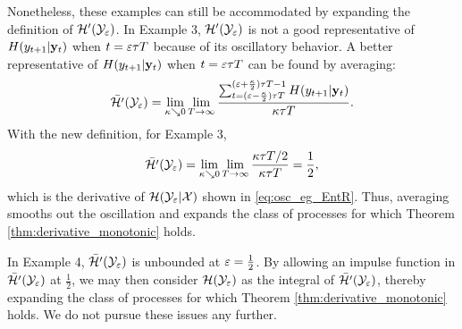 \documentclass[12pt, draftclsnofoot,journal,onecolumn]{IEEEtran}
\begin{document}
{Nonetheless, these examples can still be accommodated by expanding the definition of ${\mathcal{H}{'}}(\mathcal{Y}_\varepsilon)$.
In Example 3, ${\mathcal{H}{'}}(\mathcal{Y}_\varepsilon)$ is not a good representative of $H(y_{t+1}|{\mathbf{y}}_{t})$ when $t={\varepsilon{\tau T}}$ because of its oscillatory behavior. A better representative of $H(y_{t+1}|{\mathbf{y}}_{t})$ when $t={\varepsilon{\tau T}}$ can be found by averaging:
\begin{equation*}
    \bar{{\mathcal{H}{'}}}({\mathcal{Y}}_{\varepsilon}) =\lim_{\kappa{\searrow} 0}\lim_{T\to\infty}\frac{\sum_{t={(\varepsilon-\frac{\kappa}{2}){\tau T}}}^{{(\varepsilon+\frac{\kappa}{2}){\tau T}}-1}H(y_{t+1}|{\mathbf{y}}_{t})}{\kappa{\tau T}}.
\end{equation*}
With the new definition, for Example 3, 
\begin{align*}
    \bar{{\mathcal{H}{'}}}({\mathcal{Y}}_{\varepsilon}) =\lim_{\kappa{\searrow} 0}\lim_{T\to\infty}\frac{\kappa{\tau T}/2}{\kappa{\tau T}}=\frac{1}{2},
\end{align*}
which is the derivative of $\mathcal{H}(\mathcal{Y}_\varepsilon|\mathcal{X})$ shown in \eqref{eq:osc_eg_EntR}. Thus, averaging smooths out the oscillation and expands the class of processes for which Theorem \ref{thm:derivative_monotonic} holds.

In Example 4, $\bar{{\mathcal{H}{'}}}({\mathcal{Y}}_{\varepsilon})$ is unbounded at $\varepsilon=\frac{1}{2}$.  By allowing an impulse function in $\bar{{\mathcal{H}{'}}}({\mathcal{Y}}_{\varepsilon})$ at $\frac{1}{2}$, we may then consider $\mathcal{H}(\mathcal{Y}_\varepsilon)$ as the integral of $\bar{{\mathcal{H}{'}}}({\mathcal{Y}}_{\varepsilon})$, thereby expanding the class of processes for which Theorem \ref{thm:derivative_monotonic} holds.  We do not pursue these issues any further.
}
\end{document}
